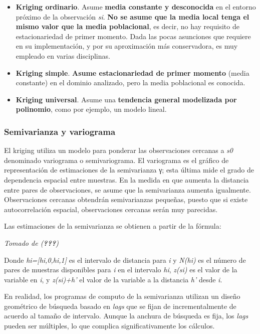 \documentclass[11pt,]{article}
\begin{document}
\begin{itemize}
\item
  \textbf{Kriging ordinario}. Asume \textbf{media constante y
  desconocida} en el entorno próximo de la observación \emph{si}.
  \textbf{No se asume que la media local tenga el mismo valor que la
  media poblacional}, es decir, no hay requisito de estacionariedad de
  primer momento. Dada las pocas asunciones que requiere en su
  implementación, y por su aproximación más conservadora, es muy
  empleado en varias disciplinas.
\item
  \textbf{Kriging simple}. \textbf{Asume estacionariedad de primer
  momento} (media constante) en el dominio analizado, pero la media
  poblacional es conocida.
\item
  \textbf{Kriging universal}. Asume una \textbf{tendencia general
  modelizada por polinomio}, como por ejemplo, un modelo lineal.
\end{itemize}

\subsubsection{Semivarianza y
variograma}\label{semivarianza-y-variograma}

El kriging utiliza un modelo para ponderar las observaciones cercanas a
\emph{s0} denominado variograma o semivariograma. El variograma es el
gráfico de representación de estimaciones de la semivarianza γ; esta
última mide el grado de dependencia espacial entre muestras. En la
medida en que aumenta la distancia entre pares de observaciones, se
asume que la semivarianza aumenta igualmente. Observaciones cercanas
obtendrán semivarianzas pequeñas, puesto que si existe autocorrelación
espacial, observaciones cercanas serán muy parecidas.

Las estimaciones de la semivarianza se obtienen a partir de la fórmula:

\emph{Tomado de ({\textbf{???}})}

Donde \emph{hi={[}hi,0,hi,1{]}} es el intervalo de distancia para
\emph{i} y \emph{N(hi)} es el número de pares de muestras disponibles
para \emph{i} en el intervalo \emph{hi}, \emph{z(si)} es el valor de la
variable en \emph{i}, y \emph{z(si)+h'} el valor de la variable a la
distancia \emph{h'} desde \emph{i}.

En realidad, los programas de computo de la semivarianza utilizan un
diseño geométrico de búsqueda basado en \emph{lags} que se fijan de
incrementalmente de acuerdo al tamaño de intervalo. Aunque la anchura de
búsqueda es fija, los \emph{lags} pueden ser múltiples, lo que complica
significativamente los cálculos.
\end{document}
